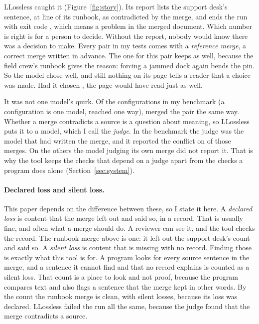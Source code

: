 LLossless caught it (Figure~\ref{fig:story}). Its report lists the support desk's sentence, at line  of its runbook, as contradicted by the merge, and ends the run with exit code , which means a problem in the merged document. Which number is right is for a person to decide. Without the report, nobody would know there was a decision to make. Every pair in my tests comes with a \emph{reference merge}, a correct merge written in advance. The one for this pair keeps  as well, because the field crew's runbook gives the reason: forcing a jammed dock again bends the pin. So the model chose well, and still nothing on its page tells a reader that a choice was made. Had it chosen , the page would have read just as well.



It was not one model's quirk. Of the  configurations in my benchmark (a configuration is one model, reached one way),  merged the pair the same way. Whether a merge contradicts a source is a question about meaning, so LLossless puts it to a model, which I call the \emph{judge}. In the benchmark the judge was the model that had written the merge, and it reported the conflict on  of those  merges. On the others the model judging its own merge did not report it. That is why the tool keeps the checks that depend on a judge apart from the checks a program does alone (Section~\ref{sec:system}).

\paragraph{Declared loss and silent loss.} This paper depends on the difference between these, so I state it here. A \emph{declared loss} is content that the merge left out and said so, in a record. That is usually fine, and often what a merge should do. A reviewer can see it, and the tool checks the record. The runbook merge above is one: it left out the support desk's count and said so. A \emph{silent loss} is content that is missing with no record. Finding those is exactly what this tool is for. A program looks for every source sentence in the merge, and a sentence it cannot find and that no record explains is counted as a silent loss. That count is a place to look and not proof, because the program compares text and also flags a sentence that the merge kept in other words. By the count the runbook merge is clean, with  silent losses, because its loss was declared. LLossless failed the run all the same, because the judge found that the merge contradicts a source.

